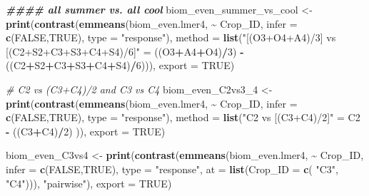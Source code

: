\documentclass[
]{article}
\newenvironment{Shaded}{\begin{snugshade}}{\end{snugshade}}
\newcommand{\AttributeTok}[1]{\textcolor[rgb]{0.13,0.29,0.53}{#1}}
\newcommand{\CommentTok}[1]{\textcolor[rgb]{0.56,0.35,0.01}{\textit{#1}}}
\newcommand{\ConstantTok}[1]{\textcolor[rgb]{0.56,0.35,0.01}{#1}}
\newcommand{\DecValTok}[1]{\textcolor[rgb]{0.00,0.00,0.81}{#1}}
\newcommand{\DocumentationTok}[1]{\textcolor[rgb]{0.56,0.35,0.01}{\textbf{\textit{#1}}}}
\newcommand{\FunctionTok}[1]{\textcolor[rgb]{0.13,0.29,0.53}{\textbf{#1}}}
\newcommand{\NormalTok}[1]{#1}
\newcommand{\OtherTok}[1]{\textcolor[rgb]{0.56,0.35,0.01}{#1}}
\newcommand{\SpecialCharTok}[1]{\textcolor[rgb]{0.81,0.36,0.00}{\textbf{#1}}}
\newcommand{\StringTok}[1]{\textcolor[rgb]{0.31,0.60,0.02}{#1}}
\begin{document}
\begin{Shaded}
\begin{Highlighting}[]
\DocumentationTok{\#\#\#\# all summer vs. all cool}
\NormalTok{biom\_even\_summer\_vs\_cool }\OtherTok{\textless{}{-}} \FunctionTok{print}\NormalTok{(}\FunctionTok{contrast}\NormalTok{(}\FunctionTok{emmeans}\NormalTok{(biom\_even.lmer4, }\SpecialCharTok{\textasciitilde{}}\NormalTok{ Crop\_ID,}
                                                   \AttributeTok{infer =} \FunctionTok{c}\NormalTok{(}\ConstantTok{FALSE}\NormalTok{,}\ConstantTok{TRUE}\NormalTok{),}
                                                   \AttributeTok{type =} \StringTok{"response"}\NormalTok{),}
                                           \AttributeTok{method =} \FunctionTok{list}\NormalTok{(}\StringTok{"[(O3+O4+A4)/3] vs [(C2+S2+C3+S3+C4+S4)/6]"} \OtherTok{=} 
\NormalTok{                                                           ((O3}\SpecialCharTok{+}\NormalTok{A4}\SpecialCharTok{+}\NormalTok{O4)}\SpecialCharTok{/}\DecValTok{3}\NormalTok{)  }\SpecialCharTok{{-}}\NormalTok{ ((C2}\SpecialCharTok{+}\NormalTok{S2}\SpecialCharTok{+}\NormalTok{C3}\SpecialCharTok{+}\NormalTok{S3}\SpecialCharTok{+}\NormalTok{C4}\SpecialCharTok{+}\NormalTok{S4)}\SpecialCharTok{/}\DecValTok{6}\NormalTok{))), }
                                  \AttributeTok{export =} \ConstantTok{TRUE}\NormalTok{)}

\CommentTok{\# C2 vs (C3+C4)/2 and C3 vs C4}
\NormalTok{biom\_even\_C2vs3\_4 }\OtherTok{\textless{}{-}} \FunctionTok{print}\NormalTok{(}\FunctionTok{contrast}\NormalTok{(}\FunctionTok{emmeans}\NormalTok{(biom\_even.lmer4, }\SpecialCharTok{\textasciitilde{}}\NormalTok{ Crop\_ID,}
                                            \AttributeTok{infer =} \FunctionTok{c}\NormalTok{(}\ConstantTok{FALSE}\NormalTok{,}\ConstantTok{TRUE}\NormalTok{), }
                                            \AttributeTok{type =} \StringTok{"response"}\NormalTok{),}
                                    \AttributeTok{method =} \FunctionTok{list}\NormalTok{(}\StringTok{"C2 vs [(C3+C4)/2]"} \OtherTok{=}\NormalTok{ C2 }\SpecialCharTok{{-}}\NormalTok{ ((C3}\SpecialCharTok{+}\NormalTok{C4)}\SpecialCharTok{/}\DecValTok{2}\NormalTok{) )),}
                           \AttributeTok{export =} \ConstantTok{TRUE}\NormalTok{)}

\NormalTok{biom\_even\_C3vs4 }\OtherTok{\textless{}{-}} \FunctionTok{print}\NormalTok{(}\FunctionTok{contrast}\NormalTok{(}\FunctionTok{emmeans}\NormalTok{(biom\_even.lmer4, }\SpecialCharTok{\textasciitilde{}}\NormalTok{ Crop\_ID, }
                                          \AttributeTok{infer =} \FunctionTok{c}\NormalTok{(}\ConstantTok{FALSE}\NormalTok{,}\ConstantTok{TRUE}\NormalTok{), }
                                          \AttributeTok{type =} \StringTok{"response"}\NormalTok{,}
                                          \AttributeTok{at =} \FunctionTok{list}\NormalTok{(}\AttributeTok{Crop\_ID =} \FunctionTok{c}\NormalTok{( }\StringTok{"C3"}\NormalTok{, }\StringTok{"C4"}\NormalTok{))), }\StringTok{"pairwise"}\NormalTok{), }
                         \AttributeTok{export =} \ConstantTok{TRUE}\NormalTok{) }


\end{Highlighting}
\end{Shaded}
\end{document}
